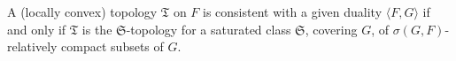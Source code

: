 A (locally convex) topology $\mathfrak{T}$ on $F$ is consistent with a given duality $\langle F, G \rangle$ if and only if $\mathfrak{T}$ is the $\mathfrak{S}$-topology for a saturated class $\mathfrak{S}$, covering $G$, of $\sigma(G, F)$-relatively compact subsets of $G$.
